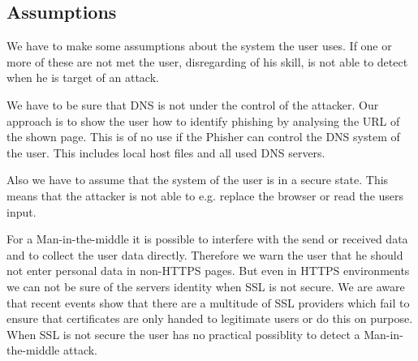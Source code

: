 \subsection{Assumptions}
We have to make some assumptions about the system the user uses. If one or more of these are not met the user, disregarding of his skill, is not able to detect when he is target of an attack.
\begin{description}[leftmargin=0cm]
	\item[Secure DNS] We have to be sure that DNS is not under the control of the attacker.
	Our approach is to show the user how to identify phishing by analysing the URL of the shown page.
	This is of no use if the Phisher can control the DNS system of the user.
	This includes local host files and all used DNS servers.
	\item[Secure Smartphone] Also we have to assume that the system of the user is in a secure state.
	This means that the attacker is not able to e.g. replace the browser or read the users input.
	\item[Secure SSL] 
	For a Man-in-the-middle it is possible to interfere with the send or received data and to collect the user data directly.
	Therefore we warn the user that he should not enter personal data in non-HTTPS pages.
	But even in HTTPS environments we can not be sure of the servers identity when SSL is not secure.
	We are aware that recent events show that there are a multitude of SSL providers which fail to ensure that certificates are only handed to legitimate users or do this on purpose.
	When SSL is not secure the user has no practical possiblity to detect a Man-in-the-middle attack.		
\end{description}

